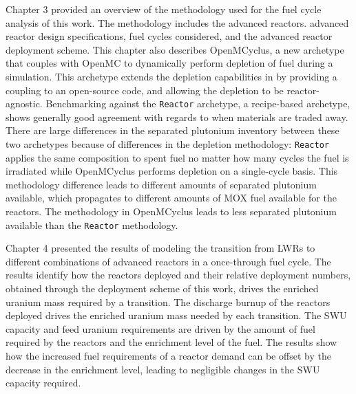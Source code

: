 Chapter 3 provided an overview of the methodology used for the fuel 
cycle analysis of this work. The methodology includes the 
advanced reactors. advanced reactor design specifications,
fuel cycles considered, and the 
advanced reactor deployment scheme. This chapter also 
describes OpenMCyclus, a new archetype that couples \Cyclus with 
OpenMC to dynamically perform depletion of fuel during a simulation. 
This archetype extends the depletion capabilities in 
\Cyclus by providing a coupling to an open-source code, and 
allowing the depletion to be reactor-agnostic. 
Benchmarking against the \Cycamore \texttt{Reactor} archetype, 
a recipe-based archetype, shows generally good agreement with 
regards to when materials are traded away. There 
are large differences in the separated plutonium inventory between 
these two archetypes because of differences in the 
depletion methodology: \Cycamore \texttt{Reactor} applies the 
same composition to spent fuel no matter how many cycles the 
fuel is irradiated while OpenMCyclus performs depletion on a 
single-cycle basis. This methodology difference leads to different 
amounts of separated plutonium available, which propagates 
to different amounts of \gls{MOX} fuel available for the 
reactors. The methodology in OpenMCyclus leads to less 
separated plutonium available than the \Cycamore 
\texttt{Reactor} methodology. 

Chapter 4 presented the results of modeling the transition from 
\glspl{LWR} to different combinations of advanced reactors in 
a once-through fuel cycle. 
The results identify how 
the reactors deployed and their relative deployment numbers, obtained 
through the deployment scheme of this work, drives 
the enriched uranium mass required by a transition. The discharge
burnup of the reactors deployed drives the enriched uranium 
mass needed by each transition. The \gls{SWU} capacity and 
feed uranium requirements are driven by the amount of fuel required 
by the reactors and the enrichment level of the fuel. The results 
show how the increased fuel requirements of a reactor demand can 
be offset by the decrease in the enrichment level, leading to 
negligible changes in the \gls{SWU} capacity required. 

